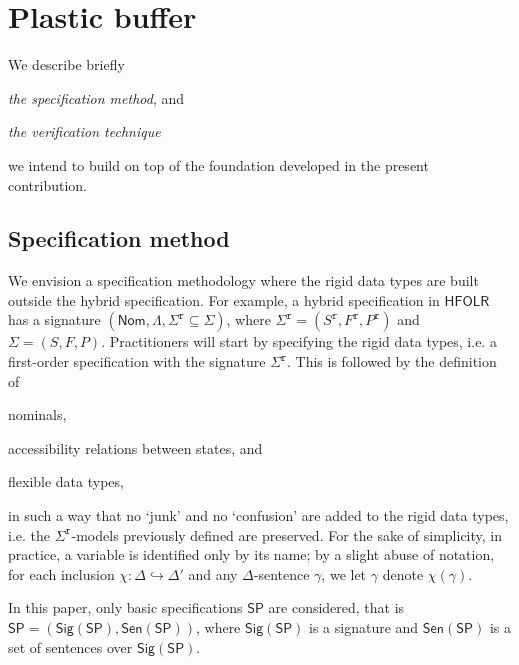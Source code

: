 \documentclass{article}
\newcommand{\HFOLR}{{\mathsf{HFOLR}}}
\newcommand{\Sig}{\mathsf{Sig}}
\newcommand{\Sen}{\mathsf{Sen}}
\newcommand{\Nom}{\mathsf{Nom}}
\newcommand{\rigid}{{\mathtt{r}}}
\newcommand{\SP}{{\mathsf{SP}}}
\begin{document}
\section{Plastic buffer} \label{section:case:study}

We describe briefly 
\begin{enumerate*}
\item  \emph{the specification method}, and 
\item \emph{the verification technique} 
\end{enumerate*}
we intend to build on top of the foundation developed in the present contribution. 


\subsection{Specification method}

We envision a specification methodology where the rigid data types are built outside the hybrid specification.
For example, a hybrid specification in $\HFOLR$ has a signature $(\Nom,\Lambda,\Sigma^\rigid\subseteq\Sigma)$, where $\Sigma^\rigid=(S^\rigid,F^\rigid,P^\rigid)$ and $\Sigma=(S,F,P)$.
Practitioners will start by specifying the rigid data types, i.e. a first-order specification with the signature $\Sigma^\rigid$. 
This is followed by the definition of 
\begin{enumerate*}[label=(\alph*)]
\item nominals, 
\item accessibility relations between states, and 
\item flexible data types,
\end{enumerate*} 
 in such a way that  no `junk' and no `confusion' are added to the rigid data types, i.e. the $\Sigma^\rigid$-models previously defined are preserved.
 For the sake of simplicity, in practice, a variable is identified only by its name; by a slight abuse of notation, for each inclusion $\chi\colon\Delta\hookrightarrow\Delta'$ and any $\Delta$-sentence $\gamma$, we let $\gamma$ denote $\chi(\gamma)$.
 
 In this paper, only basic specifications $\SP$ are considered, that is $\SP=(\Sig(\SP),\Sen(\SP))$, where $\Sig(\SP)$ is a signature and $\Sen(\SP)$ is a set of sentences over $\Sig(\SP)$.
\end{document}
